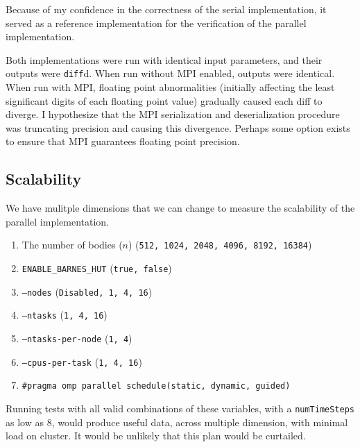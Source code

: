 \documentclass[11pt,a4paper]{article}
\begin{document}
Because of my confidence in the correctness of the serial implementation, it served as a reference implementation for the verification of the parallel implementation.

Both implementations were run with identical input parameters, and their outputs were \texttt{diff}d. When run without MPI enabled, outputs were identical. When run with MPI, floating point abnormalities (initially affecting the least significant digits of each floating point value) gradually caused each diff to diverge. I hypothesize that the MPI serialization and deserialization procedure was truncating precision and causing this divergence. Perhaps some option exists to ensure that MPI guarantees floating point precision.


\subsection*{Scalability}

We have mulitple dimensions that we can change to measure the scalability of the parallel implementation.

\begin{enumerate}
    \item The number of bodies ($n$) (\texttt{512, 1024, 2048, 4096, 8192, 16384})
    \item \texttt{ENABLE\_BARNES\_HUT} (\texttt{true, false})
    \item \texttt{--nodes} (\texttt{Disabled, 1, 4, 16})
    \item \texttt{--ntasks} (\texttt{1, 4, 16})
    \item \texttt{--ntasks-per-node} (\texttt{1, 4})
    \item \texttt{--cpus-per-task} (\texttt{1, 4, 16})
    \item \texttt{\#pragma omp parallel schedule(static, dynamic, guided)}
\end{enumerate}

Running tests with all valid combinations of these variables, with a \texttt{numTimeSteps} as low as 8, would produce useful data, across multiple dimension, with minimal load on cluster. It would be unlikely that this plan would be curtailed.
\end{document}
